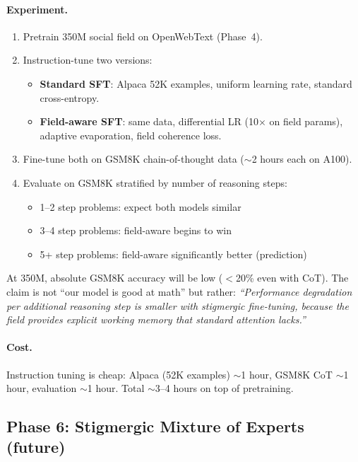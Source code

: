 \documentclass[11pt,a4paper]{article}
\begin{document}
\paragraph{Experiment.}
\begin{enumerate}
    \item Pretrain 350M social field on OpenWebText (Phase~4).
    \item Instruction-tune two versions:
    \begin{itemize}
        \item \textbf{Standard SFT}: Alpaca 52K examples, uniform
              learning rate, standard cross-entropy.
        \item \textbf{Field-aware SFT}: same data, differential LR
              (10$\times$ on field params), adaptive evaporation,
              field coherence loss.
    \end{itemize}
    \item Fine-tune both on GSM8K chain-of-thought data ($\sim$2
          hours each on A100).
    \item Evaluate on GSM8K stratified by number of reasoning steps:
    \begin{itemize}
        \item 1--2 step problems: expect both models similar
        \item 3--4 step problems: field-aware begins to win
        \item 5+ step problems: field-aware significantly better
              (prediction)
    \end{itemize}
\end{enumerate}

At 350M, absolute GSM8K accuracy will be low ($<$20\% even with CoT).
The claim is not ``our model is good at math'' but rather:
\emph{``Performance degradation per additional reasoning step is
smaller with stigmergic fine-tuning, because the field provides
explicit working memory that standard attention lacks.''}

\paragraph{Cost.} Instruction tuning is cheap: Alpaca (52K examples)
$\sim$1 hour, GSM8K CoT $\sim$1 hour, evaluation $\sim$1 hour.
Total $\sim$3--4 hours on top of pretraining.


\subsection{Phase 6: Stigmergic Mixture of Experts (future)}
\end{document}

